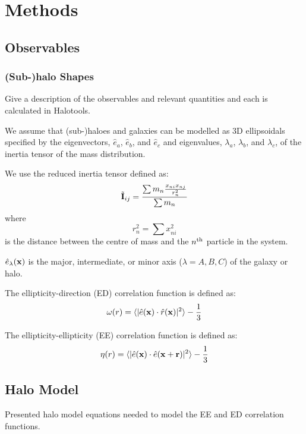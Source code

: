 \documentclass[fleqn,usenatbib]{mnras}
\begin{document}
\section{Methods}

\subsection{Observables}

\subsubsection{(Sub-)halo Shapes}
Give a description of the observables and relevant quantities and each is calculated in Halotools.

We assume that (sub-)haloes and galaxies can be modelled as 3D ellipsoidals specified by the eigenvectors, $\hat{e}_a$, $\hat{e}_b$, and $\hat{e}_c$ and eigenvalues, $\lambda_a$, $\lambda_b$, and $\lambda_c$, of the inertia tensor of the mass distribution. 

We use the reduced inertia tensor defined as:
%
\begin{equation}
\tilde{\bf I}_{ij} = \frac{\sum m_n \frac{x_{ni} x_{nj}}{r_{n}^2}}{\sum m_n}
\end{equation}
%
where
%
\begin{equation}
r_{n}^2 = \sum x_{ni}^2
\end{equation}
%
is the distance between the centre of mass and the $n^{\rm th}$ particle in the system.

$\hat{e}_{\lambda}({\bf x})$ is the major, intermediate, or minor axis ($\lambda=A,B,C$) of the galaxy or halo.  

The ellipticity-direction (ED) correlation function is defined as: 
\begin{equation}
\omega(r) = \langle |\hat{e}({\bf x}) \cdot \hat{r}({\bf x})|^2 \rangle -\frac{1}{3}
\end{equation}

The ellipticity-ellipticity (EE) correlation function is defined as: 
\begin{equation}
\eta(r) = \langle |\hat{e}({\bf x}) \cdot \hat{e}({\bf x}+{\bf r})|^2 \rangle -\frac{1}{3}
\end{equation}


\subsection{Halo Model}
Presented halo model equations needed to model the EE and ED correlation functions.
\end{document}
